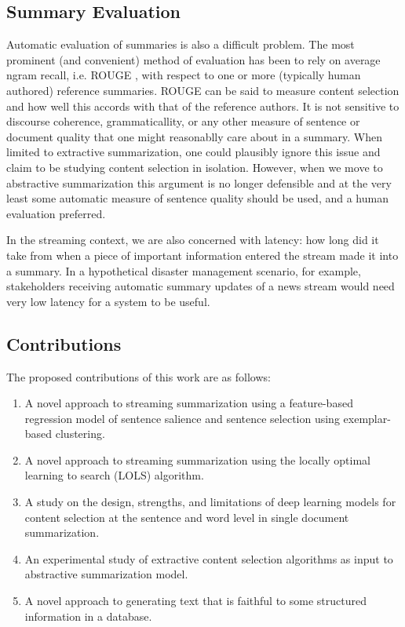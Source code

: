 \subsection{Summary Evaluation}
Automatic evaluation of summaries is also a difficult problem.
The most prominent (and convenient) method of evaluation has been
to rely on average ngram recall, i.e. ROUGE \cite{rougepeople},
with respect to one or more (typically human authored) reference
summaries. ROUGE can be said to measure content selection and
how well this accords with that of the reference authors.
It is not sensitive to discourse coherence, grammaticallity,
or any other measure of sentence or document quality
that one might reasonablly care about in a summary.
When limited to extractive summarization, one could plausibly 
ignore this issue and claim to be studying content selection in
isolation. However, when we move to abstractive summarization
this argument is no longer defensible and at the very least
some automatic measure of sentence quality should be used,
and a human evaluation preferred.

In the streaming context, we are also concerned with latency:
how long did it take from when a piece of important 
information entered the stream made it into a summary.
In a hypothetical disaster management scenario, for example,
stakeholders receiving automatic summary updates of a news
stream would need very low latency for a system to be useful.


\subsection{Contributions}

The proposed contributions of this work are as follows:
\begin{enumerate}

 \item A novel approach to streaming summarization using a feature-based
     regression model of sentence salience and sentence selection using 
     exemplar-based clustering.

 \item A novel approach to streaming summarization using the locally optimal
     learning to search (LOLS) algorithm.

 \item A study on the design, strengths, and limitations of deep learning 
     models for content selection at the sentence and word level in 
     single document summarization. 

 \item An experimental study of extractive content selection algorithms
     as input to abstractive summarization model.

 \item A novel approach to generating text that is faithful to some
     structured information in a database.

\end{enumerate}


